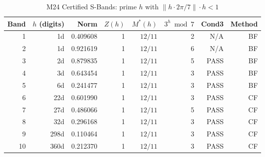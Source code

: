 \begin{table}[h!]
\centering
\caption{M24 Certified S-Bands: prime $h$ with $\|h \cdot 2\pi/7\| \cdot h < 1$}
\begin{tabular}{rrrrrrrr}
\hline
Band & $h$ (digits) & Norm & $Z(h)$ & $M^*(h)$ & $3^h\bmod 7$ & Cond3 & Method \\
\hline
1 & 1d & 0.409608 & 1 & $12/11$ & 2 & N/A & BF \\
2 & 1d & 0.921619 & 1 & $12/11$ & 6 & N/A & BF \\
3 & 2d & 0.879835 & 1 & $12/11$ & 5 & PASS & BF \\
4 & 3d & 0.643454 & 1 & $12/11$ & 3 & PASS & BF \\
5 & 6d & 0.241477 & 1 & $12/11$ & 3 & PASS & BF \\
6 & 22d & 0.601990 & 1 & $12/11$ & 3 & PASS & CF \\
7 & 27d & 0.486066 & 1 & $12/11$ & 5 & PASS & CF \\
8 & 32d & 0.296168 & 1 & $12/11$ & 3 & PASS & CF \\
9 & 298d & 0.110464 & 1 & $12/11$ & 3 & PASS & CF \\
10 & 360d & 0.212370 & 1 & $12/11$ & 3 & PASS & CF \\
\hline
\end{tabular}
\label{tab:m24_sbands}
\end{table}
